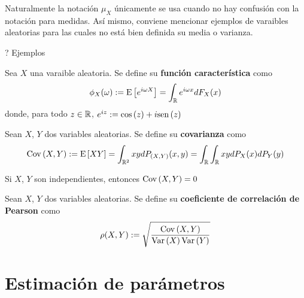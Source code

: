 Naturalmente la notación $\mu_X$ únicamente se usa cuando no hay confusión con la notación para medidas. Así mismo, conviene mencionar ejemplos de varaibles aleatorias para las cuales no está bien definida su media o varianza.

? Ejemplos


\begin{definicion}
Sea $X$ una varaible aleatoria. Se define su \textbf{función característica} como
\begin{equation}
\phi_X (\omega) := \mathrm{E}\left[ e^{i \omega X} \right] = \int_{\mathbb{R}} e^{i \omega x} dF_X(x)
\end{equation}
donde, para todo $z\in \mathbb{R}$, $e^{i z} := \mathrm{cos}\left( z \right) + i \mathrm{sen}\left( z \right)$
\end{definicion}

\begin{definicion}
Sean $X$, $Y$ dos variables aleatorias. Se define su \textbf{covarianza} como
\begin{equation}
\mathrm{Cov}\left( X,Y \right) := \mathrm{E}\left[ X Y \right] = \int_{\mathbb{R}^{2}} x y d P_{(X,Y)}(x,y) = \int_{\mathbb{R}} \int_{\mathbb{R}} x y dP_X(x) dP_Y(y)
\end{equation}
\end{definicion}

\begin{proposicion}
Si $X$, $Y$ son independientes, entonces $\mathrm{Cov}\left( X,Y \right) = 0$
\end{proposicion}

\begin{definicion}
Sean $X$, $Y$ dos variables aleatorias. Se define su \textbf{coeficiente de correlación de Pearson} como
\begin{equation}
\rho (X,Y) := \sqrt{\frac{\mathrm{Cov}\left( X,Y \right)}{\mathrm{Var}\left( X \right) \mathrm{Var}\left( Y \right)}}
\end{equation}
\end{definicion}



\section{Estimación de parámetros}


